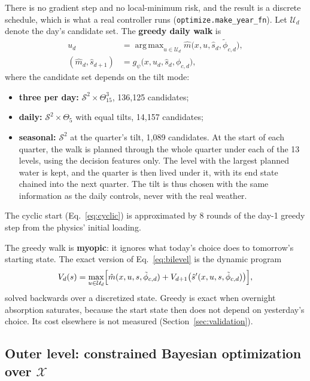 \documentclass[11pt]{article}
\newcommand{\code}[1]{\texttt{#1}}
\DeclareMathOperator*{\argmax}{arg\,max}
\begin{document}
There is no gradient step and no local-minimum risk, and the result is a discrete schedule,
which is what a real controller runs (\code{optimize.make\_year\_fn}). Let $\mathcal{U}_d$
denote the day's candidate set. The \textbf{greedy daily walk} is
\begin{align}
u_d &= \argmax_{u \in \mathcal{U}_d} \hat m\bigl(x, u, \hat s_d, \tilde\phi_{c,d}\bigr), \\
(\hat m_d, \hat s_{d+1}) &= g_\psi\bigl(x, u_d, \hat s_d, \phi_{c,d}\bigr),
\end{align}
where the candidate set depends on the tilt mode:
\begin{itemize}
\item \textbf{three per day:} $\mathcal{S}^2 \times \Theta_{15}^3$, 136,125 candidates;
\item \textbf{daily:} $\mathcal{S}^2 \times \Theta_5$ with equal tilts, 14,157 candidates;
\item \textbf{seasonal:} $\mathcal{S}^2$ at the quarter's tilt, 1,089 candidates. At the
start of each quarter, the walk is planned through the whole quarter under each of the 13
levels, using the decision features only. The level with the largest planned water is kept,
and the quarter is then lived under it, with its end state chained into the next quarter.
The tilt is thus chosen with the same information as the daily controls, never with the
real weather.
\end{itemize}
The cyclic start (Eq.~\eqref{eq:cyclic}) is approximated by 8 rounds of the day-1 greedy step
from the physics' initial loading.

The greedy walk is \textbf{myopic}: it ignores what today's choice does to tomorrow's starting
state. The exact version of Eq.~\eqref{eq:bilevel} is the dynamic program
\begin{equation}
V_d(s) = \max_{u \in \mathcal{U}_d} \Bigl[\hat m(x, u, s, \tilde\phi_{c,d})
+ V_{d+1}\bigl(\hat s'(x, u, s, \tilde\phi_{c,d})\bigr)\Bigr],
\end{equation}
solved backwards over a discretized state. Greedy is exact when overnight absorption
saturates, because the start state then does not depend on yesterday's choice. Its cost
elsewhere is not measured (Section~\ref{sec:validation}).

\subsection{Outer level: constrained Bayesian optimization over $\mathcal{X}$}
\end{document}
